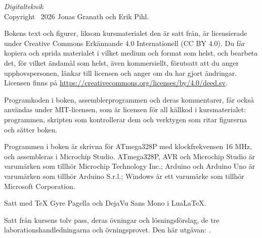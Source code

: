 \thispagestyle{empty}
\vspace*{\fill}
{\small
\noindent\textit{Digitalteknik}\\
Copyright \textcopyright\ 2026 Jonas Granath och Erik Pihl.

\medskip
\noindent Bokens text och figurer, liksom kursmaterialet den är satt från, är licensierade under
Creative Commons Erkännande 4.0 Internationell (CC BY 4.0). Du får kopiera och sprida materialet i
vilket medium och format som helst, och bearbeta det, för vilket ändamål som helst, även
kommersiellt, förutsatt att du anger upphovspersonen, länkar till licensen och anger om du har
gjort ändringar. Licensen finns på \url{https://creativecommons.org/licenses/by/4.0/deed.sv}.

\medskip
\noindent Programkoden i boken, assemblerprogrammen och deras kommentarer, får också användas
under MIT-licensen, som är licensen för all källkod i kursmaterialet: programmen, skripten som
kontrollerar dem och verktygen som ritar figurerna och sätter boken.

\medskip
\noindent Programmen i boken är skrivna för ATmega328P med klockfrekvensen 16 MHz, och assembleras
i Microchip Studio. ATmega328P, AVR och Microchip Studio är varumärken som tillhör Microchip
Technology Inc.; Arduino och Arduino Uno är varumärken som tillhör Arduino S.r.l.; Windows är ett
varumärke som tillhör Microsoft Corporation.

\medskip
\noindent Satt med TeX Gyre Pagella och DejaVu Sans Mono i Lua\LaTeX.

\medskip
\noindent\textcolor{muted}{Satt från kursens tolv pass, deras övningar och lösningsförslag, de
tre laborationshandledningarna och övningsprovet. Den här utgåvan: \bookedition.}
\par}
\cleardoublepage
